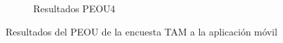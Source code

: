 \begin{figure}[H]
\begin{subfigure}[b]{0.4\textwidth}
        \caption{Resultados PEOU4}
    \end{subfigure}%
    \caption{Resultados del PEOU de la encuesta TAM a la aplicación móvil}
    \label{fig:TAM-m-PEOU-Result}
\end{figure}

